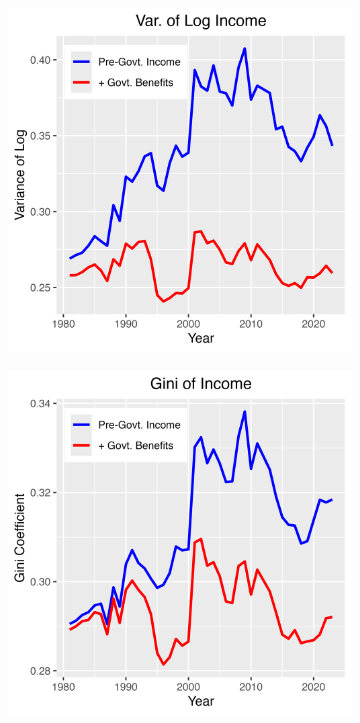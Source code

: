 \documentclass{article}
\begin{document}
\begin{figure}
    \centering
    \begin{subfigure}[t]{0.475\textwidth}
        \centering
        \includegraphics[width=\textwidth]{figures/Fig_5/Fig_5a_Var_inc.png}
        \label{fig:Gov_Var1}
    \end{subfigure}
    \begin{subfigure}[t]{0.475\textwidth}
        \centering
        \includegraphics[width=\textwidth]{figures/Fig_5/Fig_5b_Gini_inc.png}

\end{subfigure}
\end{figure}
\end{document}
